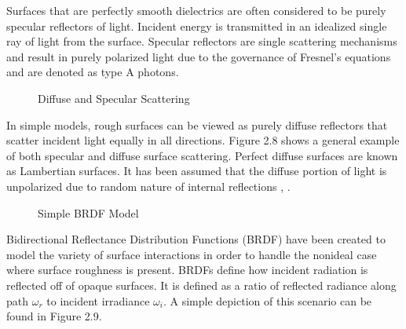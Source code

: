 Surfaces that are perfectly smooth dielectrics are often considered to be purely specular reflectors of light.  Incident energy is transmitted in an idealized single ray of light from the surface.  Specular reflectors are single scattering mechanisms and result in purely polarized light due to the governance of Fresnel’s equations and are denoted as type A photons.
%
\begin{figure}
    \begin{center}
    \end{center}
    \caption{Diffuse and Specular Scattering}
    \label{fig:scattering}
\end{figure}
%
In simple models, rough surfaces can be viewed as purely diffuse reflectors that scatter incident light equally in all directions.  Figure 2.8 shows a general example of both specular and diffuse surface scattering.  Perfect diffuse surfaces are known as Lambertian surfaces.  It has been assumed that the diffuse portion of light is unpolarized due to random nature of internal reflections \cite{specularclass}, \cite{grant}.
\begin{figure}
    \begin{center}
    \end{center}
    \caption{Simple BRDF Model}
    \label{fig:scattering}
\end{figure}
Bidirectional Reflectance Distribution Functions (BRDF) have been created to model the variety of surface interactions in order to handle the nonideal case where surface roughness is present. BRDFs define how incident radiation is reflected off of opaque surfaces.  It is defined as a ratio of reflected radiance along path $\omega_r$ to incident irradiance $\omega_i$. A simple depiction of this scenario can be found in Figure 2.9.

